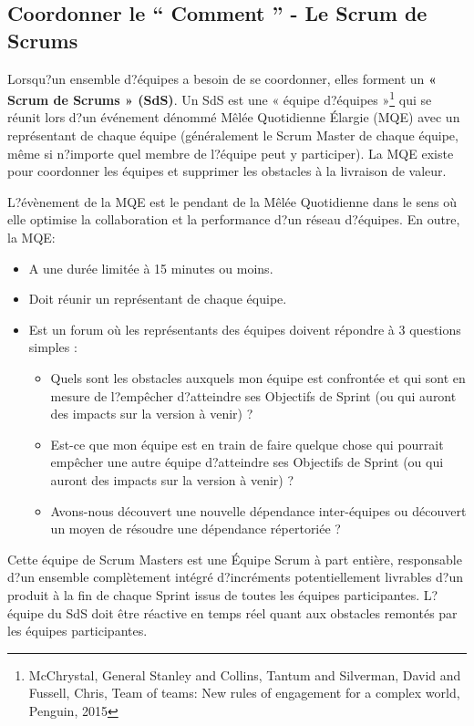 \documentclass[12pt,a4paper,parskip=full]{scrartcl}
\begin{document}
\subsection{Coordonner le `` Comment '' - Le Scrum de Scrums}
Lorsqu?un ensemble d?équipes a besoin de se coordonner, elles forment un \textbf{« Scrum de
Scrums » (SdS)}. Un SdS est une « équipe d?équipes »\footnote{McChrystal, General Stanley and Collins, Tantum and
Silverman, David and Fussell, Chris, Team of teams: New rules of engagement
for a complex world, Penguin, 2015} qui se réunit lors d?un événement
dénommé Mêlée Quotidienne Élargie (MQE) avec un représentant de chaque équipe
(généralement le Scrum Master de chaque équipe, même si n?importe quel membre de
l?équipe peut y participer). La MQE existe pour coordonner les équipes et supprimer les obstacles à la livraison 
de valeur.

L?évènement de la MQE est le pendant de la Mêlée Quotidienne dans le sens où elle
optimise la collaboration et la performance d?un réseau d?équipes. En outre, la MQE:

\begin{itemize}
\item A une durée limitée à 15 minutes ou moins.
\item Doit réunir un représentant de chaque équipe.
\item Est un forum où les représentants des équipes doivent répondre à 3 questions
simples :
\begin{itemize}
\item Quels sont les obstacles auxquels mon équipe est confrontée et qui sont en
mesure de l?empêcher d?atteindre ses Objectifs de Sprint (ou qui auront des
impacts sur la version à venir) ?
\item Est-ce que mon équipe est en train de faire quelque chose qui pourrait
empêcher une autre équipe d?atteindre ses Objectifs de Sprint (ou qui auront
des impacts sur la version à venir) ?
\item Avons-nous découvert une nouvelle dépendance inter-équipes ou découvert
un moyen de résoudre une dépendance répertoriée ?
\end{itemize}
\end{itemize}
Cette équipe de Scrum Masters est une Équipe Scrum à part entière, responsable d?un
ensemble complètement intégré d?incréments potentiellement livrables d?un produit à la fin
de chaque Sprint issus de toutes les équipes participantes. L?équipe du SdS doit être
réactive en temps réel quant aux obstacles remontés par les équipes participantes.
\end{document}
